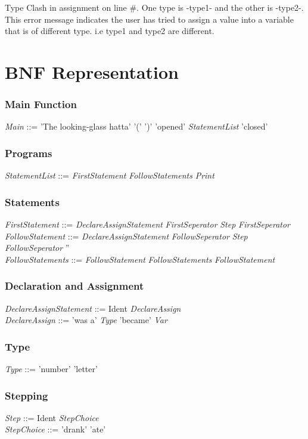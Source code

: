 \documentclass[10pt]{article}
\begin{document}
  Type Clash in assignment on line \#. One type is -type1- and the other is -type2-.
  \\
  This error message indicates the user has tried to assign a value into a variable that is of different type. i.e type1 and type2 are different.
  \newpage
  \section{BNF Representation}
  \subsubsection{Main Function}
  \emph{Main} ::= 'The looking-glass hatta' '(' ')' 'opened' \emph{StatementList} 'closed'
  \subsubsection{Programs}
  \emph{StatementList} ::= \emph{FirstStatement} \emph{FollowStatements} \textbar \space \emph{Print} 
  \subsubsection{Statements}
  \emph{FirstStatement} ::= \emph{DeclareAssignStatement} \emph{FirstSeperator} \textbar \space \emph{Step} \emph{FirstSeperator}
  \\
  \emph{FollowStatement} ::= \emph{DeclareAssignStatement} \emph{FollowSeperator} \textbar \space \emph{Step} \emph{FollowSeperator} \textbar \space '' 
  \\
  \emph{FollowStatements} ::= \emph{FollowStatement} \emph{FollowStatements} \textbar \space \emph{FollowStatement}
  \subsubsection{Declaration and Assignment}
  \emph{DeclareAssignStatement} ::= Ident \emph{DeclareAssign}
  \\
  \emph{DeclareAssign} ::= 'was a' \emph{Type} \textbar \space 'became' \emph{Var} 
  \subsubsection{Type}
  \emph{Type} ::= 'number' \textbar \space 'letter'
  \subsubsection{Stepping}
  \emph{Step} ::= Ident \emph{StepChoice}
  \\
  \emph{StepChoice} ::= 'drank' \textbar \space 'ate'
\end{document}
